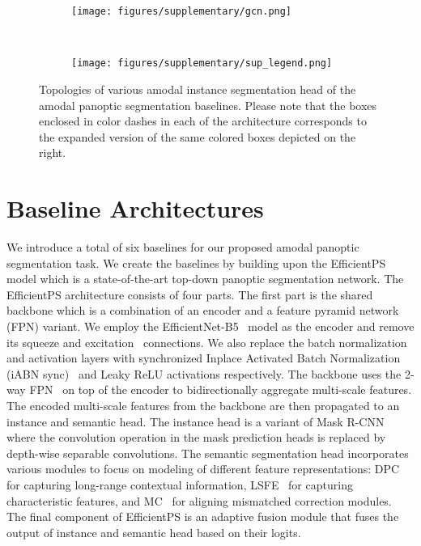 \documentclass[10pt,twocolumn,letterpaper]{article}
\begin{document}
\begin{figure*}
    \hspace{0.2cm} 
    \begin{subfigure}[b]{0.3\linewidth}
        \centering
        \texttt{[image: figures/supplementary/gcn.png]}
\end{subfigure}
    \\
    \vspace{0.2cm}
    \begin{subfigure}[b]{0.7\linewidth}
        \centering
        \texttt{[image: figures/supplementary/sup\_legend.png]}
        \label{panoptic_segmentation_egs}
    \end{subfigure}
\vspace{-0.5cm}
\caption{Topologies of various amodal instance segmentation head of the amodal panoptic segmentation baselines. Please note that the boxes enclosed in color dashes in each of the architecture corresponds to the expanded version of the same colored boxes depicted on the right.}
    \label{fig:bnetwork}
\end{figure*}

\section{Baseline Architectures}
\label{sec:supp_baseline}

We introduce a total of six baselines for our proposed amodal panoptic segmentation task. We create the baselines by building upon the EfficientPS~\cite{mohan2020efficientps} model which is a state-of-the-art top-down panoptic segmentation network. The EfficientPS architecture consists of four parts. The first part is the shared backbone which is a combination of an encoder and a feature pyramid network (FPN) variant. We employ the EfficientNet-B5~\cite{tan2019efficientnet} model as the encoder and remove its squeeze and excitation~\cite{hu2018squeeze} connections. We also replace the batch normalization and activation layers with synchronized Inplace Activated Batch Normalization (iABN sync)~\cite{bulo2018place} and Leaky ReLU activations respectively. The backbone uses the 2-way FPN~\cite{mohan2020efficientps} on top of the encoder to bidirectionally aggregate multi-scale features. The encoded multi-scale features from the backbone are then propagated to an instance and semantic head. The instance head is a variant of Mask R-CNN~\cite{he2017mask} where the convolution operation in the mask prediction heads is replaced by depth-wise separable convolutions. The semantic segmentation head incorporates various modules to focus on modeling of different feature representations: DPC~\cite{chen2018searching} for capturing long-range contextual information, LSFE~\cite{mohan2020efficientps} for capturing characteristic features, and MC~\cite{mohan2020efficientps} for aligning mismatched correction modules. The final component of EfficientPS is an adaptive fusion module that fuses the output of instance and semantic head based on their logits.
\end{document}
